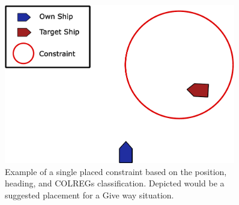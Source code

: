 \begin{figure}[ht]
    \centering
    \includegraphics[width=0.9\textwidth]{Images/Constraint_Example.pdf}
    \caption{Example of a single placed constraint based on the position, heading, and COLREGs classification. Depicted would be a suggested
    placement for a Give way situation.}
    \label{FIG: Dynamic Constraint Example}
\end{figure}





